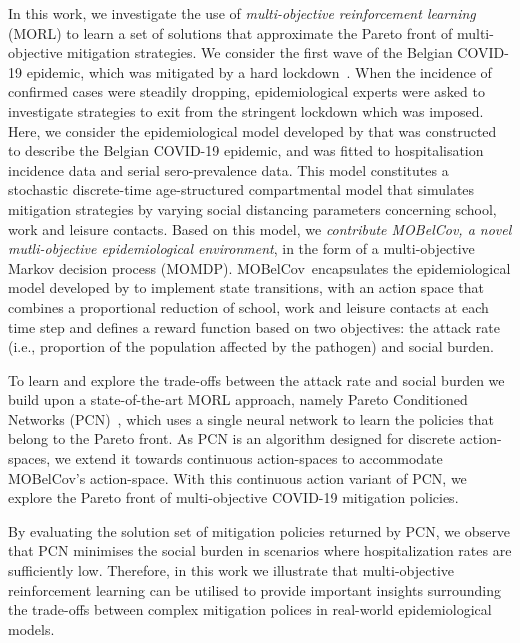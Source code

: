 \documentclass{article}
\renewcommand{\cite}[1]{\citep{#1}}
\newcommand{\momdpname}{MOBelCov}
\begin{document}
In this work, we investigate the use of \emph{multi-objective reinforcement learning} (MORL) to learn a set of solutions that approximate the Pareto front of multi-objective mitigation strategies. We consider the first wave of the Belgian COVID-19 epidemic, which was mitigated by a hard lockdown~\cite{willem2021impact}. When the incidence of confirmed cases were steadily dropping, epidemiological experts were asked to investigate strategies to exit from the stringent lockdown which was imposed.
Here, we consider the epidemiological model developed by \citet{abrams2021modelling} that was constructed to describe the Belgian COVID-19 epidemic, and was fitted to hospitalisation incidence data and serial sero-prevalence data.
This model constitutes a stochastic discrete-time age-structured compartmental model that simulates mitigation strategies by varying social distancing parameters concerning school, work and leisure contacts.  
Based on this model, we \emph{contribute \momdpname, a novel mutli-objective epidemiological environment}, in the form of a multi-objective Markov decision process (MOMDP). \momdpname\ encapsulates the epidemiological model developed by \citet{abrams2021modelling} to implement state transitions, with an action space that combines a proportional reduction of school, work and leisure contacts at each time step and defines a reward function based on two objectives: the attack rate (i.e., proportion of the population affected by the pathogen) and social burden.

To learn and explore the trade-offs between the attack rate and social burden we build upon a state-of-the-art MORL approach, namely Pareto Conditioned Networks (PCN)~\cite{reymond2022pcn}, which uses a single neural network to learn the policies that belong to the Pareto front.
As PCN is an algorithm designed for discrete action-spaces, we extend it towards continuous action-spaces to accommodate \momdpname's action-space. With this continuous action variant of PCN, we explore the Pareto front of multi-objective COVID-19 mitigation policies.  

By evaluating the solution set of mitigation policies returned by PCN, we observe that PCN minimises the social burden in scenarios where hospitalization rates are sufficiently low. Therefore, in this work we illustrate that multi-objective reinforcement learning can be utilised to provide important insights surrounding the trade-offs between complex mitigation polices in real-world epidemiological models.

\end{document}
